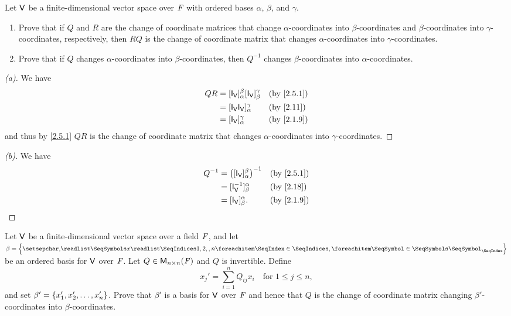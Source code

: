 \begin{ex}\label{ex:2.5.11}
  Let \(\mathsf{V}\) be a finite-dimensional vector space over \(\mathit{F}\) with ordered bases \(\alpha\), \(\beta\), and \(\gamma\).
  \begin{enumerate}
    \item Prove that if \(Q\) and \(R\) are the change of coordinate matrices that change \(\alpha\)-coordinates into \(\beta\)-coordinates and \(\beta\)-coordinates into \(\gamma\)-coordinates, respectively, then \(RQ\) is the change of coordinate matrix that changes \(\alpha\)-coordinates into \(\gamma\)-coordinates.
    \item Prove that if \(Q\) changes \(\alpha\)-coordinates into \(\beta\)-coordinates, then \(Q^{-1}\) changes \(\beta\)-coordinates into \(\alpha\)-coordinates.
  \end{enumerate}
\end{ex}

\begin{proof}[(a)]
  We have
  \begin{align*}
    QR & = [\IT[\V]]_{\alpha}^{\beta} [\IT[\V]]_{\beta}^{\gamma} &  & \text{(by \cref{2.5.1})} \\
       & = [\IT[\V] \IT[\V]]_{\alpha}^{\gamma}                   &  & \text{(by \cref{2.11})}  \\
       & = [\IT[\V]]_{\alpha}^{\gamma}                           &  & \text{(by \cref{2.1.9})}
  \end{align*}
  and thus by \cref{2.5.1} \(QR\) is the change of coordinate matrix that changes \(\alpha\)-coordinates into \(\gamma\)-coordinates.
\end{proof}

\begin{proof}[(b)]
  We have
  \begin{align*}
    Q^{-1} & = \pa{[\IT[\V]]_{\alpha}^{\beta}}^{-1} &  & \text{(by \cref{2.5.1})} \\
           & = [\IT[\V]^{-1}]_{\beta}^{\alpha}      &  & \text{(by \cref{2.18})}  \\
           & = [\IT[\V]]_{\beta}^{\alpha}.          &  & \text{(by \cref{2.1.9})}
  \end{align*}
\end{proof}

\setcounter{ex}{12}
\begin{ex}\label{ex:2.5.13}
  Let \(\mathsf{V}\) be a finite-dimensional vector space over a field \(\mathit{F}\), and let \(\beta = \set{\seq{x}{1,2,,n}}\) be an ordered basis for \(\mathsf{V}\) over \(\mathit{F}\).
  Let \(Q \in \mathsf{M}_{{n} \times n}({\mathit{F}})\) and \(Q\) is invertible.
  Define
  \[
    x_j' = \sum_{i = 1}^n Q_{i j} x_i \quad \text{for } 1 \leq j \leq n,
  \]
  and set \(\beta' = \left\lbrace x_1', x_2', \dots, x_n'\right\rbrace\).
  Prove that \(\beta'\) is a basis for \(\mathsf{V}\) over \(\mathit{F}\) and hence that \(Q\) is the change of coordinate matrix changing \(\beta'\)-coordinates into \(\beta\)-coordinates.
\end{ex}

